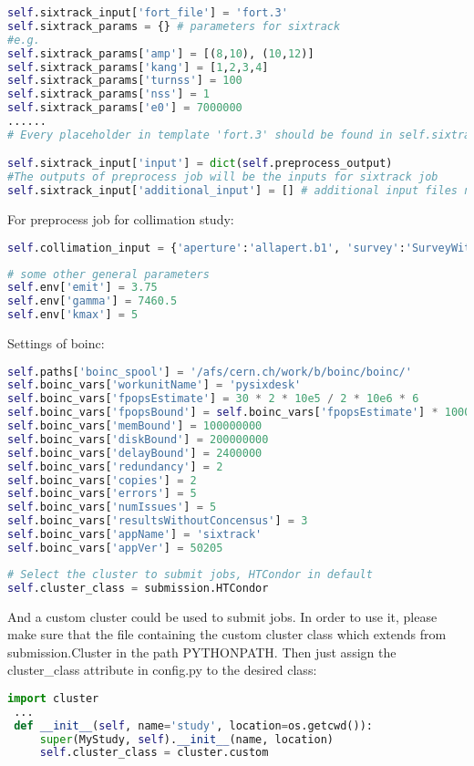 \begin{lstlisting}[language=Python]
self.sixtrack_input['fort_file'] = 'fort.3'
self.sixtrack_params = {} # parameters for sixtrack
#e.g.
self.sixtrack_params['amp'] = [(8,10), (10,12)]
self.sixtrack_params['kang'] = [1,2,3,4]
self.sixtrack_params['turnss'] = 100
self.sixtrack_params['nss'] = 1
self.sixtrack_params['e0'] = 7000000
......
# Every placeholder in template 'fort.3' should be found in self.sixtrack_params dict. 

self.sixtrack_input['input'] = dict(self.preprocess_output)
#The outputs of preprocess job will be the inputs for sixtrack job
self.sixtrack_input['additional_input'] = [] # additional input files needed by sixtrack jobs if any
\end{lstlisting}

For preprocess job for collimation study:
\begin{lstlisting}[language=Python]
self.collimation_input = {'aperture':'allapert.b1', 'survey':'SurveyWithCrossing_XP_lowb.dat'}
\end{lstlisting}

\begin{lstlisting}[language=Python]
# some other general parameters
self.env['emit'] = 3.75
self.env['gamma'] = 7460.5
self.env['kmax'] = 5
\end{lstlisting}

Settings of boinc:
\begin{lstlisting}[language=Python]
self.paths['boinc_spool'] = '/afs/cern.ch/work/b/boinc/boinc/'
self.boinc_vars['workunitName'] = 'pysixdesk'
self.boinc_vars['fpopsEstimate'] = 30 * 2 * 10e5 / 2 * 10e6 * 6
self.boinc_vars['fpopsBound'] = self.boinc_vars['fpopsEstimate'] * 1000
self.boinc_vars['memBound'] = 100000000
self.boinc_vars['diskBound'] = 200000000
self.boinc_vars['delayBound'] = 2400000
self.boinc_vars['redundancy'] = 2
self.boinc_vars['copies'] = 2
self.boinc_vars['errors'] = 5
self.boinc_vars['numIssues'] = 5
self.boinc_vars['resultsWithoutConcensus'] = 3
self.boinc_vars['appName'] = 'sixtrack'
self.boinc_vars['appVer'] = 50205
\end{lstlisting}

\begin{lstlisting}[language=Python]
# Select the cluster to submit jobs, HTCondor in default
self.cluster_class = submission.HTCondor 
\end{lstlisting}
And a custom cluster could be used to submit jobs. In order to use it, please make sure that the file containing the custom cluster class which extends from submission.Cluster in the path PYTHONPATH. Then just assign the cluster\_class attribute in config.py to the desired class:
\begin{lstlisting}[language=Python]
 import cluster
 ...
 def __init__(self, name='study', location=os.getcwd()):
     super(MyStudy, self).__init__(name, location)
     self.cluster_class = cluster.custom
\end{lstlisting}

